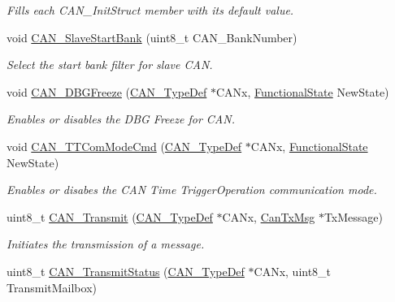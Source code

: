 \begin{DoxyCompactItemize}
\begin{DoxyCompactList}\small\item\em Fills each C\+A\+N\+\_\+\+Init\+Struct member with its default value. \end{DoxyCompactList}\item 
void \mbox{\hyperlink{group___c_a_n___exported___functions_ga109ff8960bc59f44b984c9646f17b3c0}{C\+A\+N\+\_\+\+Slave\+Start\+Bank}} (uint8\+\_\+t C\+A\+N\+\_\+\+Bank\+Number)
\begin{DoxyCompactList}\small\item\em Select the start bank filter for slave C\+AN. \end{DoxyCompactList}\item 
void \mbox{\hyperlink{group___c_a_n___exported___functions_gac0e2d33e08caf49d1f1251f0dcc20213}{C\+A\+N\+\_\+\+D\+B\+G\+Freeze}} (\mbox{\hyperlink{struct_c_a_n___type_def}{C\+A\+N\+\_\+\+Type\+Def}} $\ast$C\+A\+Nx, \mbox{\hyperlink{group___exported__types_gac9a7e9a35d2513ec15c3b537aaa4fba1}{Functional\+State}} New\+State)
\begin{DoxyCompactList}\small\item\em Enables or disables the D\+BG Freeze for C\+AN. \end{DoxyCompactList}\item 
void \mbox{\hyperlink{group___c_a_n___exported___functions_ga94740177bab153ca5b102d122f9a8cca}{C\+A\+N\+\_\+\+T\+T\+Com\+Mode\+Cmd}} (\mbox{\hyperlink{struct_c_a_n___type_def}{C\+A\+N\+\_\+\+Type\+Def}} $\ast$C\+A\+Nx, \mbox{\hyperlink{group___exported__types_gac9a7e9a35d2513ec15c3b537aaa4fba1}{Functional\+State}} New\+State)
\begin{DoxyCompactList}\small\item\em Enables or disabes the C\+AN Time Trigger\+Operation communication mode. \end{DoxyCompactList}\item 
uint8\+\_\+t \mbox{\hyperlink{group___c_a_n___exported___functions_gaccfcb81f76f58400077c7b2d8641dd83}{C\+A\+N\+\_\+\+Transmit}} (\mbox{\hyperlink{struct_c_a_n___type_def}{C\+A\+N\+\_\+\+Type\+Def}} $\ast$C\+A\+Nx, \mbox{\hyperlink{struct_can_tx_msg}{Can\+Tx\+Msg}} $\ast$Tx\+Message)
\begin{DoxyCompactList}\small\item\em Initiates the transmission of a message. \end{DoxyCompactList}\item 
uint8\+\_\+t \mbox{\hyperlink{group___c_a_n___exported___functions_ga68ab05a0a6cdfcc2b6f6b6b2c10848e2}{C\+A\+N\+\_\+\+Transmit\+Status}} (\mbox{\hyperlink{struct_c_a_n___type_def}{C\+A\+N\+\_\+\+Type\+Def}} $\ast$C\+A\+Nx, uint8\+\_\+t Transmit\+Mailbox)

\end{DoxyCompactItemize}
